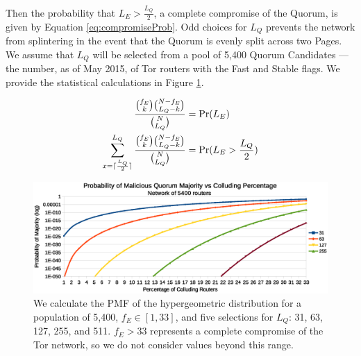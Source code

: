 \documentclass{sig-alternate}
\DeclarePairedDelimiter{\ceil}{\lceil}{\rceil}
\begin{document}


Then the probability that $ L_{E} > \frac{L_{Q}}{2} $, a complete compromise of the Quorum, is given by Equation \ref{eq:compromiseProb}. Odd choices for $ L_{Q} $ prevents the network from splintering in the event that the Quorum is evenly split across two Pages. We assume that $ L_{Q} $ will be selected from a pool of 5,400 Quorum Candidates --- the number, as of May 2015, of Tor routers with the Fast and Stable flags. We provide the statistical calculations in Figure \ref{fig:quorumMajority}.

\begin{align}
	\frac{\binom{f_{E}}{k}\binom{N - f_{E}}{L_{Q} - k}}{\binom{N}{L_{Q}}} &= \mathrm{Pr}(L_{E})
	\label{eq:hypergeoPMF}
	\\
	\displaystyle\sum_{x=\ceil{\frac{L_{Q}}{2}}}^{L_{Q}} \frac{\binom{f_{E}}{k}\binom{N - f_{E}}{L_{Q} - k}}{\binom{N}{L_{Q}}} &= \mathrm{Pr}(L_{E} > \frac{L_{Q}}{2})
	\label{eq:compromiseProb}
\end{align}


\begin{figure}[h]
	\centering
	\includegraphics[width=\linewidth]{../analysis/MaliciousQuorumProbability_tight.eps}
	\caption{We calculate the PMF of the hypergeometric distribution for a population of 5,400, $ f_{E} \in [1,33] $, and five selections for $ L_{Q} $: 31, 63, 127, 255, and 511. $ f_{E} > 33 $ represents a complete compromise of the Tor network, so we do not consider values beyond this range.}
	\label{fig:quorumMajority}
\end{figure}
\end{document}
